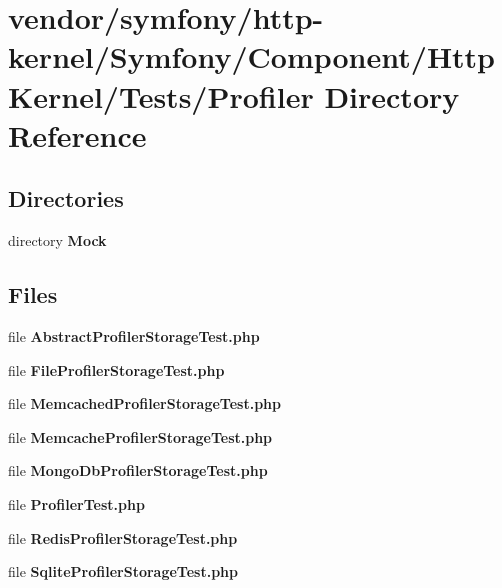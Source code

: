 \section{vendor/symfony/http-\/kernel/\+Symfony/\+Component/\+Http\+Kernel/\+Tests/\+Profiler Directory Reference}
\label{dir_df30bbad2700746e2454a79451496a5e}
\subsection*{Directories}
\begin{DoxyCompactItemize}
\item 
directory {\bf Mock}
\end{DoxyCompactItemize}
\subsection*{Files}
\begin{DoxyCompactItemize}
\item 
file {\bf Abstract\+Profiler\+Storage\+Test.\+php}
\item 
file {\bf File\+Profiler\+Storage\+Test.\+php}
\item 
file {\bf Memcached\+Profiler\+Storage\+Test.\+php}
\item 
file {\bf Memcache\+Profiler\+Storage\+Test.\+php}
\item 
file {\bf Mongo\+Db\+Profiler\+Storage\+Test.\+php}
\item 
file {\bf Profiler\+Test.\+php}
\item 
file {\bf Redis\+Profiler\+Storage\+Test.\+php}
\item 
file {\bf Sqlite\+Profiler\+Storage\+Test.\+php}
\end{DoxyCompactItemize}
